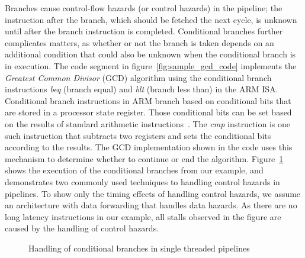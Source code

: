 Branches cause control-flow hazards (or control hazards) in the pipeline; the instruction after the branch, which should be fetched the next cycle, is unknown until after the branch instruction is completed.
Conditional branches further complicates matters, as whether or not the branch is taken depends on an additional condition that could also be unknown when the conditional branch is in execution. 
The code segment in figure~\ref{fig:sample_gcd_code} implements the \emph{Greatest Common Divisor} (GCD) algorithm using the conditional branch instructions \emph{beq} (branch equal) and \emph{blt} (branch less than) in the ARM ISA.  
Conditional branch instructions in ARM branch based on conditional bits that are stored in a processor state register.
Those conditional bits can be set based on the results of standard arithmetic instructions~\cite{armrefman}.
The \emph{cmp} instruction is one such instruction that subtracts two registers and sets the conditional bits according to the results.
The GCD implementation shown in the code uses this mechanism to determine whether to continue or end the algorithm.
Figure~\ref{fig:branch_execution_non_interleaved_pipeline} shows the execution of the conditional branches from our example, and demonstrates two commonly used techniques to handling control hazards in pipelines. 
To show only the timing effects of handling control hazards, we assume an architecture with data forwarding that handles data hazards.
As there are no long latency instructions in our example, all stalls observed in the figure are caused by the handling of control hazards.  

\begin{figure}
\begin{center}
\noindent{}
\end{center}
\vspace{-3mm}
\caption{Handling of conditional branches in single threaded pipelines}
\label{fig:branch_execution_non_interleaved_pipeline}
\end{figure}

